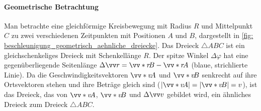 \paragraph{Geometrische Betrachtung}
Man betrachte eine gleichförmige Kreisbewegung mit Radius $R$ und Mittelpunkt $C$ zu zwei verschiedenen Zeitpunkten mit Positionen $A$ und $B$, dargestellt in \cref{fig: beschleunigung_geometrisch_aehnliche_dreiecke}. Das Dreieck $\triangle ABC$ ist ein gleichschenkeliges Dreieck mit Schenkellänge $R$. Der spitze Winkel $\Delta \varphi$ hat eine gegenüberliegende Seitenlänge $\Delta \ivec{r} = \ivecS{r}{B}-\ivecS{r}{A}$ (blaue, strichlierte Linie). Da die Geschwindigkeitsvektoren $\ivecS{v}{A}$ und $\ivecS{v}{B}$ senkrecht auf ihre Ortsvektoren stehen und ihre Beträge gleich sind ($|\ivecS{v}{A}| = |\ivecS{v}{B}| = v$), ist das Dreieck, das von $\ivecS{v}{A}$, $\ivecS{v}{B}$ und $\Delta\ivec{v}$ gebildet wird, ein ähnliches Dreieck zum Dreieck $\triangle ABC$.
